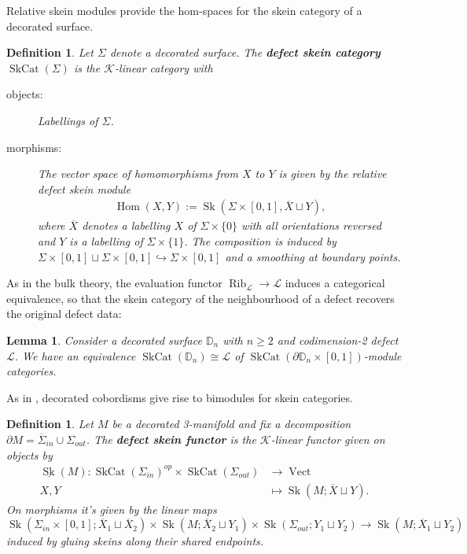\documentclass[a4paper]{article}
\numberwithin{equation}{section}
\newtheorem{definition}[counter]{Definition}
\newtheorem{lemma}[counter]{Lemma}
\newcommand{\1}{{\mathrm{1}\mkern-4mu{\mathchoice{}{}{\mskip-0.5mu}{\mskip-1mu}}\mathrm{l}}}
\newcommand{\DD}{\mathbb{D}}
\DeclareMathOperator{\Hom}{Hom}
\newcommand{\K}{\mathcal{K}}
\renewcommand{\L}{\mathcal{L}}
\DeclareMathOperator{\Vect}{Vect}
\DeclareMathOperator{\Sk}{Sk}
\DeclareMathOperator{\SkCat}{SkCat}
\DeclareMathOperator{\Rib}{Rib}
\begin{document}
Relative skein modules provide the hom-spaces for the skein category of a decorated surface.
\begin{definition}\label{def:defect-skein-cat}
    Let $\Sigma$ denote a decorated surface. The \emph{\bf{defect skein category}} $\SkCat(\Sigma)$ is the $\K$-linear category with 
    \begin{description}
        \item[objects:] Labellings of $\Sigma$.
        \item[morphisms:] The vector space of homomorphisms from $X$ to $Y$ is given by the relative defect skein module
        \begin{align}
            \Hom(X,Y) := \Sk(\Sigma \times [0,1],\overline{X} \sqcup Y),
        \end{align}
        where $\overline{X}$ denotes a labelling $X$ of $\Sigma \times \{0\}$ with all orientations reversed and $Y$ is a labelling of $\Sigma \times \{1\}$. The composition is induced by $\Sigma\times[0,1] \sqcup \Sigma\times[0,1] \hookrightarrow \Sigma \times [0,1]$ and a smoothing at boundary points.
    \end{description}
\end{definition}

As in the bulk theory, the evaluation functor $\Rib_\L \to \L$ induces a categorical equivalence, so that the skein category of the neighbourhood of a defect recovers the original defect data:
\begin{lemma}\label{lemma:skein_cat_of_line_defect_is_L}
    Consider a decorated surface $\DD_n$ with $n\geq 2$ and codimension-2 defect $\L$. We have an equivalence $\SkCat(\DD_n) \cong \L$ of $\SkCat(\partial\DD_n\times[0,1])$-module categories.
\end{lemma}

As in \cite{Brown_Jordan_2025,GJS2023}, decorated cobordisms give rise to bimodules for skein categories.
\begin{definition}\label{def:defect-skein-functor}
  Let $M$ be a decorated 3-manifold and fix a decomposition $\partial M = \overline{\Sigma}_{in}\cup\Sigma_{out}$.
  The \emph{\bf defect skein functor} is the $\K$-linear functor given on objects by
  \begin{equation}
    \begin{aligned}
      \underline{\Sk}(M) : \SkCat(\Sigma_{in})^{op} \times \SkCat(\Sigma_{out}) & \to \Vect \\
      X,Y &\mapsto \Sk(M;\overline{X}\sqcup Y).
    \end{aligned}
  \end{equation}
  On morphisms it's given by the linear maps
  \begin{equation}
    \Sk(\Sigma_{in}\times[0,1];\overline{X}_1\sqcup\overline{X}_2) \times \Sk(M;\overline{X}_2\sqcup Y_1) \times \Sk(\Sigma_{out}; Y_1\sqcup Y_2) \to \Sk(M;\overline{X}_1\sqcup Y_2)
  \end{equation}
  induced by gluing skeins along their shared endpoints.
\end{definition}
\end{document}
